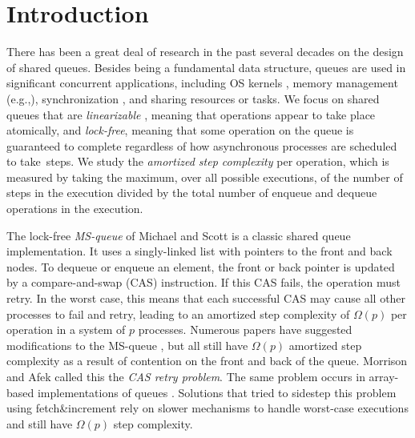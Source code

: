
\section{Introduction}

There has been a great deal of research in the past several decades on the design of shared queues.
Besides being a fundamental data structure, queues are used in
significant concurrent applications, including OS kernels \cite{MP91}, memory management (e.g.,\cite{BBFRSW21}),
synchronization \cite{KAE23}, %
 and sharing resources or tasks.
We focus on shared queues that are \emph{linearizable} \cite{HW90}, meaning that operations
appear to take place atomically, and \emph{lock-free}, meaning that some operation on the queue
is guaranteed to complete regardless of how asynchronous processes are scheduled to take~steps.
We study the \emph{amortized step complexity} per operation, which is measured by taking the maximum, over all possible
executions, of the number of steps in the execution divided by the total number of enqueue and dequeue operations in the execution.

The lock-free \emph{MS-queue} of Michael and Scott \cite{MS98} is a classic shared queue implementation.
It uses a singly-linked list with pointers to the front and back nodes.
To dequeue or enqueue an element, the front or back pointer is updated by a 
compare-and-swap (CAS) instruction.
If this CAS fails, the operation must retry.
In the worst case, this means that each successful CAS may cause all other processes to
fail and retry, leading to an amortized step complexity of $\Omega(p)$ per operation in a system of $p$ processes.
Numerous papers have suggested modifications to the MS-queue \cite{DBLP:conf/opodis/HoffmanSS07,DBLP:conf/podc/KoganH14,DBLP:conf/ppopp/KoganP11,DBLP:journals/dc/Ladan-MozesS08,MKLLP22,DBLP:conf/spaa/MoirNSS05,RC17}, but 
all still have $\Omega(p)$ amortized step complexity as a result of
contention on the front and back of the queue.
Morrison and Afek \cite{DBLP:conf/ppopp/MorrisonA13} called this the \emph{CAS retry problem}.
The same problem occurs in array-based implementations of queues \cite{DBLP:conf/iceccs/ColvinG05,DBLP:conf/opodis/GidenstamST10,DBLP:conf/icdcn/Shafiei09,DBLP:conf/spaa/TsigasZ01}.
Solutions that tried to sidestep this problem using fetch\&increment \cite{DBLP:conf/ppopp/MorrisonA13,Nik19,10.1145/3490148.3538572,DBLP:conf/ppopp/YangM16}
rely on slower mechanisms to handle worst-case executions and still have $\Omega(p)$ step complexity.


